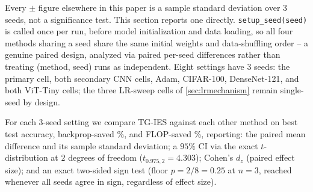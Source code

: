 \documentclass{article}
\theoremstyle{plain}
\theoremstyle{definition}
\theoremstyle{remark}
\begin{document}
Every $\pm$ figure elsewhere in this paper is a sample standard deviation over 3 seeds, not a significance test. This section reports one directly. \texttt{setup\_seed(seed)} is called once per run, before model initialization and data loading, so all four methods sharing a seed share the same initial weights and data-shuffling order -- a genuine paired design, analyzed via paired per-seed differences rather than treating (method, seed) runs as independent. Eight settings have 3 seeds: the primary cell, both secondary CNN cells, Adam, CIFAR-100, DenseNet-121, and both ViT-Tiny cells; the three LR-sweep cells of \cref{sec:lrmechanism} remain single-seed by design.

For each 3-seed setting we compare TG-IES against each other method on best test accuracy, backprop-saved \%, and FLOP-saved \%, reporting: the paired mean difference and its sample standard deviation; a $95\%$ CI via the exact $t$-distribution at $2$ degrees of freedom ($t_{0.975,2}=4.303$); Cohen's $d_z$ (paired effect size); and an exact two-sided sign test (floor $p=2/8=0.25$ at $n=3$, reached whenever all seeds agree in sign, regardless of effect size).
\end{document}
